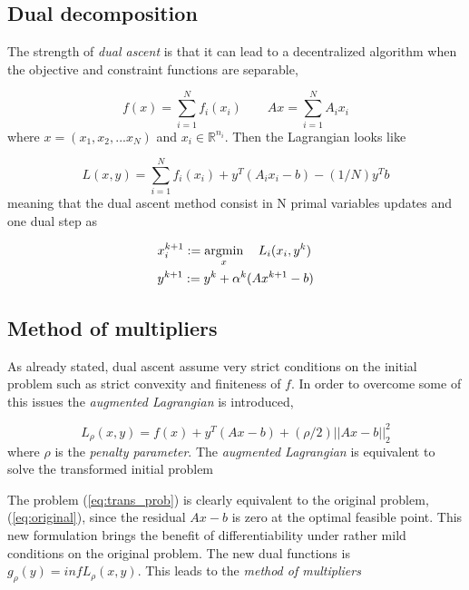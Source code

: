 \subsection{Dual decomposition}

The strength of \textit{dual ascent} is that it can lead to a decentralized algorithm when the objective and constraint functions are separable,

\begin{equation*}
f(x) = \sum_{i=1}^{N}f_i(x_i) \qquad Ax = \sum_{i=1}^{N}A_ix_i 
\end{equation*}
where $x = (x_1,x_2,...x_N)$ and $x_i \in \mathbb{R}^{n_i}$. Then the Lagrangian looks like

\begin{equation*}
	L(x,y) = \sum_{i=1}^{N}f_i(x_i)+y^T(A_ix_i - b) -(1/N)y^Tb
\end{equation*}
meaning that the dual ascent method consist in N primal variables updates and one dual step as

\begin{align}
	&x_i^{k+1} := \operatorname*{argmin}_x \quad L_i(x_i,y^k)\\
	&y^{k+1} := y^k + \alpha^k(Ax^{k+1} - b)
\end{align}

\subsection{Method of multipliers}

As already stated, dual ascent assume very strict conditions on the initial problem such as strict convexity and finiteness of $f$. In order to overcome some of this issues the \textit{augmented Lagrangian} is introduced,

\begin{equation*}
	L_\rho(x,y) = f(x) + y^T(Ax-b) + (\rho/2)||Ax-b||_2^2
\end{equation*}
where $\rho$ is the \textit{penalty parameter}. The \textit{augmented Lagrangian} is equivalent to solve the transformed initial problem 

The problem (\ref{eq:trans_prob}) is clearly equivalent to the original problem, (\ref{eq:original}), since the residual $Ax -b$ is zero at the optimal feasible point. This new formulation brings the benefit of differentiability under rather mild conditions on the original problem. The new dual functions is $g_\rho(y)=inf L_\rho(x,y)$. This leads to the \textit{method of multipliers}

